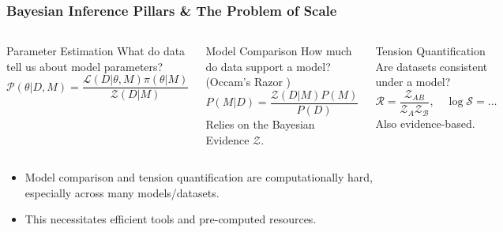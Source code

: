 \documentclass[aspectratio=169]{beamer}
\begin{document}
\begin{frame}
    \frametitle{Bayesian Inference Pillars \& The Problem of Scale}
    \begin{columns}[T]
        \begin{block}{Parameter Estimation}
            What do data tell us about model parameters?
            \[ \mathcal{P}(\theta|D,M) = \frac{\mathcal{L}(D|\theta,M) \pi(\theta|M)}{\mathcal{Z}(D|M)} \]
        \end{block}
        \begin{block}{Model Comparison}
            How much do data support a model? (Occam's Razor )
            \[ P(M|D) = \frac{\mathcal{Z}(D|M) P(M)}{P(D)} \]
            Relies on the Bayesian Evidence $\mathcal{Z}$.
        \end{block}
        \begin{block}{Tension Quantification}
            Are datasets consistent under a model? 
            \[ \mathcal{R} = \frac{\mathcal{Z}_{AB}}{\mathcal{Z}_A\mathcal{Z}_\mathcal{B}}, \quad \log \mathcal{S} = \dots  \]
            Also evidence-based.
        \end{block}
    \end{columns}
    \vfill
    \begin{itemize}
        \item Model comparison and tension quantification are computationally hard, especially across many models/datasets.
        \item This necessitates efficient tools and pre-computed resources.
    \end{itemize}
\end{frame}
\end{document}
